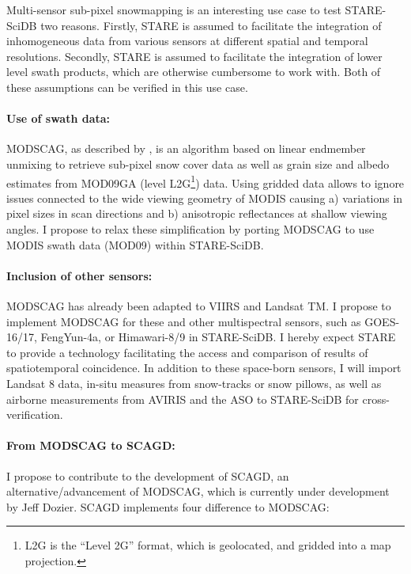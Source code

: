 \documentclass[a4paper,10pt]{article}
\begin{document}
Multi-sensor sub-pixel snowmapping is an interesting use case to test STARE-SciDB two reasons.
Firstly, \gls{STARE} is assumed to facilitate the integration of inhomogeneous data from various sensors at different spatial and temporal resolutions. 
Secondly, \gls{STARE} is assumed to facilitate the integration of lower level swath products, which are otherwise cumbersome to work with. Both of these assumptions can be verified in this use case.

\paragraph{Use of swath data:}
\gls{MODSCAG}, as described by \citep{Painter2009}, is an algorithm based on linear endmember unmixing to retrieve sub-pixel snow cover data as well as grain size and albedo estimates from MOD09GA (level \gls{L2G}\footnote{L2G is the ``Level 2G'' format, which is geolocated, and gridded into a map projection.}) data. 
Using gridded data allows to ignore issues connected to the wide viewing geometry of MODIS causing a) variations in pixel sizes in scan directions and b) anisotropic reflectances at shallow viewing angles. I  propose to relax these simplification by porting MODSCAG to use MODIS swath data (MOD09) within STARE-SciDB.

\paragraph{Inclusion of other sensors:}
MODSCAG has already been adapted to VIIRS and Landsat TM. I propose to implement MODSCAG for these and other multispectral sensors, such as \gls{GOES}-16/17, FengYun-4a, or Himawari-8/9 in STARE-SciDB. I hereby expect STARE to provide a technology facilitating the access and comparison of results of spatiotemporal coincidence. In addition to these space-born sensors, I will import Landsat 8 data, in-situ measures from snow-tracks or snow pillows, as well as airborne measurements from \gls{AVIRIS} and the \gls{ASO} to STARE-SciDB for cross-verification.

\paragraph{From \gls{MODSCAG} to \gls{SCAGD}:}
I propose to contribute to the development of \gls{SCAGD}, an alternative/advancement of \gls{MODSCAG}, which is currently under development by Jeff Dozier.
\gls{SCAGD} implements four difference to \gls{MODSCAG}:
\end{document}
